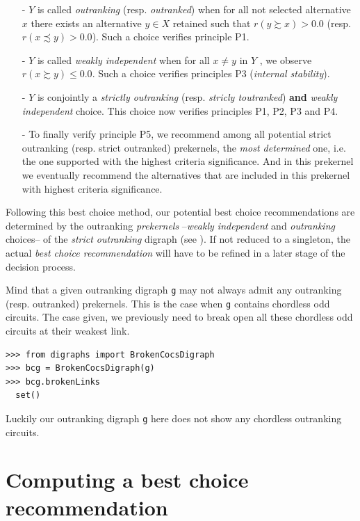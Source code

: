 \begin{itemize}[leftmargin=0.5cm,listparindent=0em,nosep]
\item [-] $Y$ is called \emph{outranking} (resp. \emph{outranked}) when for all not selected alternative $x$ there exists an alternative $y \in X$ retained such that $r(y \succsim x) > 0.0$ (resp. $r(x \precsim y) > 0.0$). Such a choice verifies principle P1.
\item [-] $Y$ is called \emph{weakly independent} when for all $x \neq y$ in $Y$ , we observe $r(x \succsim y) \leq 0.0$. Such a choice verifies principles P3 (\emph{internal stability}).
\item [-] $Y$ is conjointly a \emph{strictly outranking} (resp. \emph{stricly toutranked}) \textbf{and} \emph{weakly independent} choice. This choice now verifies principles P1, P2, P3 and P4.
\item [-] To finally verify principle P5, we recommend among all potential strict outranking (resp. strict outranked) prekernels, the \emph{most determined} one, i.e. the one supported with the highest criteria significance. And in this prekernel we eventually recommend the alternatives that are included in this prekernel with highest criteria significance.
\end{itemize}

Following this best choice method, our potential best choice recommendations are determined by the outranking \emph{prekernels} --\emph{weakly independent} and \emph{outranking} choices-- of the \emph{strict outranking} digraph (see \citet{BIS-2008a}). If not reduced to a singleton, the actual \emph{best choice recommendation} will have to be refined in a later stage of the decision process.

Mind that a given outranking digraph \texttt{g} may not always admit any outranking (resp. outranked) prekernels. This is the case when \texttt{g} contains chordless odd circuits. The case given, we previously need to break open all these chordless odd circuits at their weakest link.
\begin{lstlisting}
>>> from digraphs import BrokenCocsDigraph
>>> bcg = BrokenCocsDigraph(g)
>>> bcg.brokenLinks
  set()
\end{lstlisting}
Luckily our outranking digraph \texttt{g} here does not show any chordless outranking circuits.

\section{Computing a best choice recommendation}
\label{sec:4.4}

